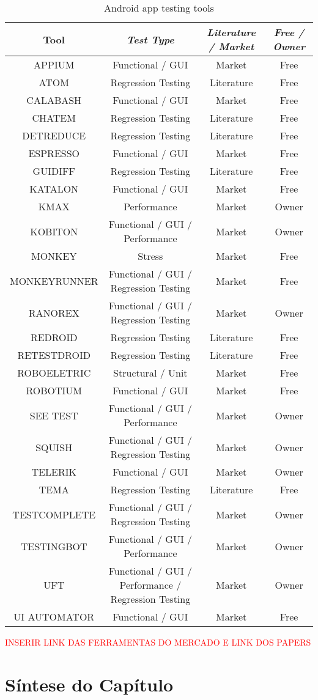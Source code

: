 \begin{table}[th]
\footnotesize
\centering
\caption{Android app testing tools}
\begin{center}
\begin{tabular}{|c|c|c|c|}
\hline
\textbf{Tool} & \textbf{\textit{Test Type}}& \textbf{\textit{Literature / Market}} & \textbf{\textit{Free / Owner}}\\\hline

APPIUM & Functional / GUI & Market & Free\\\hline
ATOM & Regression Testing & Literature & Free\\\hline
CALABASH & Functional / GUI & Market & Free\\\hline
CHATEM & Regression Testing & Literature & Free\\\hline
DETREDUCE & Regression Testing & Literature & Free\\\hline
ESPRESSO & Functional / GUI & Market & Free\\\hline
GUIDIFF & Regression Testing & Literature & Free\\\hline
KATALON & Functional / GUI & Market & Free\\\hline
KMAX & Performance & Market & Owner\\\hline
KOBITON & Functional / GUI / Performance & Market & Owner\\\hline
MONKEY & Stress & Market & Free\\\hline
MONKEYRUNNER & Functional / GUI / Regression Testing & Market & Free\\\hline
RANOREX & Functional / GUI / Regression Testing & Market & Owner\\\hline
REDROID & Regression Testing & Literature & Free\\\hline
RETESTDROID & Regression Testing & Literature & Free\\\hline
ROBOELETRIC & Structural / Unit & Market & Free\\\hline
ROBOTIUM & Functional / GUI & Market & Free\\\hline
SEE TEST & Functional / GUI / Performance & Market & Owner\\\hline
SQUISH & Functional / GUI / Regression Testing & Market & Owner\\\hline
TELERIK & Functional / GUI & Market & Owner\\\hline
TEMA & Regression Testing & Literature & Free\\\hline
TESTCOMPLETE & Functional / GUI / Regression Testing & Market & Owner\\\hline
TESTINGBOT & Functional / GUI / Performance & Market & Owner\\\hline
UFT & Functional / GUI / Performance / Regression Testing & Market & Owner\\\hline
UI AUTOMATOR & Functional / GUI & Market & Free\\\hline

\end{tabular}
\label{tab1}
\end{center}
\end{table}
\textcolor{red}{INSERIR LINK DAS FERRAMENTAS DO MERCADO E LINK DOS PAPERS}

\section{Síntese do Capítulo}